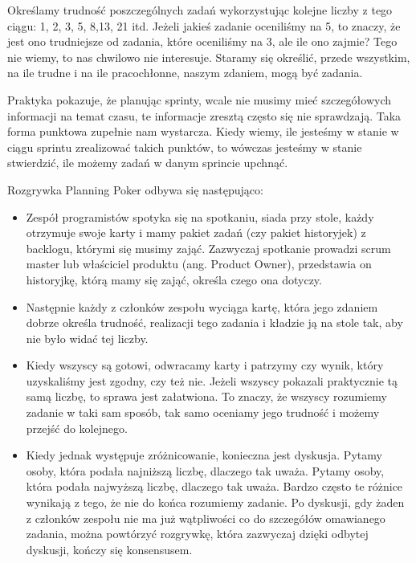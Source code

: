 Określamy trudność poszczególnych zadań wykorzystując kolejne liczby z tego ciągu: 1, 2, 3, 5, 8,13, 21 itd.
Jeżeli jakieś zadanie oceniliśmy na 5, to znaczy, że jest ono trudniejsze od zadania, które oceniliśmy na 3,
ale ile ono zajmie? Tego nie wiemy, to nas chwilowo nie interesuje.
Staramy się określić, przede wszystkim, na ile trudne i na ile pracochłonne, naszym zdaniem, mogą być zadania.

Praktyka pokazuje, że planując sprinty, wcale nie musimy mieć szczegółowych informacji na temat czasu,
te informacje zresztą często się nie sprawdzają.
Taka forma punktowa zupełnie nam wystarcza. Kiedy wiemy, ile jesteśmy w stanie w ciągu sprintu
zrealizować takich punktów, to wówczas jesteśmy w stanie stwierdzić, ile możemy zadań w danym sprincie upchnąć.

Rozgrywka Planning Poker odbywa się następująco:

\begin{itemize}
	\item Zespół programistów spotyka się na spotkaniu, siada przy stole,
	każdy otrzymuje swoje karty i mamy pakiet zadań (czy pakiet historyjek) z backlogu,
	którymi się musimy zająć.
	Zazwyczaj spotkanie prowadzi scrum master lub właściciel produktu (ang. Product Owner),
	przedstawia on historyjkę, którą mamy się zająć, określa czego ona dotyczy.
	\item Następnie każdy z członków zespołu wyciąga kartę, która jego zdaniem dobrze określa trudność,
	realizacji tego zadania i kładzie ją na stole tak, aby nie było widać tej liczby.
	\item Kiedy wszyscy są gotowi, odwracamy karty i patrzymy czy wynik, który uzyskaliśmy jest zgodny,
	czy też nie. Jeżeli wszyscy pokazali praktycznie tą samą liczbę, to sprawa jest załatwiona.
	To znaczy, że wszyscy rozumiemy zadanie w taki sam sposób, tak samo oceniamy jego trudność
	i możemy przejść do kolejnego.
	\item Kiedy jednak występuje zróżnicowanie, konieczna jest dyskusja.
	Pytamy osoby, która podała najniższą liczbę, dlaczego tak uważa.
	Pytamy osoby, która podała najwyższą liczbę, dlaczego tak uważa.
	Bardzo często te różnice wynikają z tego, że nie do końca rozumiemy zadanie.
	Po dyskusji, gdy żaden z członków zespołu nie ma już wątpliwości co do
	szczegółów omawianego zadania, można powtórzyć rozgrywkę, która zazwyczaj dzięki
	odbytej dyskusji, kończy się konsensusem.
\end{itemize}

